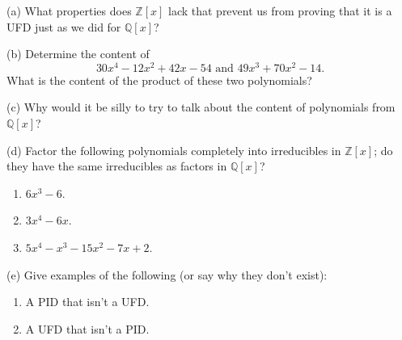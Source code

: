 \begin{problem}[Warmup]{(a)}
    What properties does $\mathbb{Z}[x]$ lack that prevent us from proving that it is a UFD just as we did for $\mathbb{Q}[x]$?
\end{problem}
\unsolved

\begin{problem}[Warmup]{(b)}
    Determine the content of \[30x^4 - 12x^2 + 42x - 54 \text{ and } 49x^3 + 70x^2 - 14.\] What is the content of the product of these two polynomials?
\end{problem}
\unsolved

\begin{problem}[Warmup]{(c)}
    Why would it be silly to try to talk about the content of polynomials from $\mathbb{Q}[x]$?
\end{problem}
\unsolved

\begin{problem}[Warmup]{(d)}
    Factor the following polynomials completely into irreducibles in $\mathbb{Z}[x]$; do they have the same irreducibles as factors in $\mathbb{Q}[x]$?
    \begin{enumerate}
        \item[(a)] $6x^3 - 6$.
        \item[(b)] $3x^4 - 6x$.
        \item[(c)] $5x^4 - x^3 - 15x^2 - 7x + 2$.
    \end{enumerate}
\end{problem}
\unsolved

\begin{problem}[Warmup]{(e)}
    Give examples of the following (or say why they don't exist):
    \begin{enumerate}
        \item[(a)] A PID that isn't a UFD.
        \item[(b)] A UFD that isn't a PID.
    \end{enumerate}
\end{problem}
\unsolved

